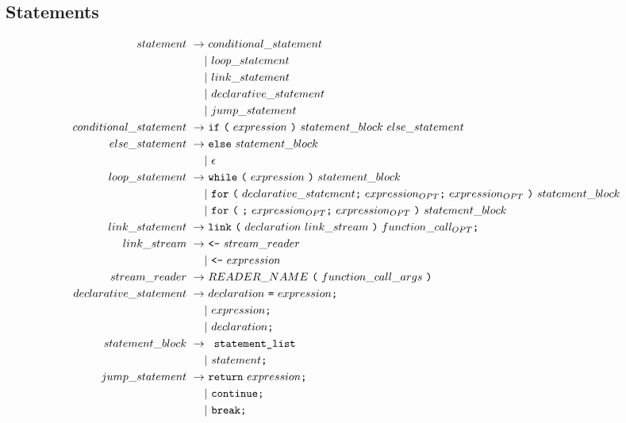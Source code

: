 \documentclass{article}
\newcommand{\code}{\texttt}
\begin{document}
\subsection{Statements}
\begin{align*}
statement\,\,\rightarrow&\,\,conditional\_statement\\
                    & |\,\,loop\_statement\\
                    & |\,\,link\_statement\\
                    & |\,\,declarative\_statement\\
                    & |\,\,jump\_statement\\
conditional\_statement\,\,\rightarrow&\,\,\code{if}\,\,\code{(}\,\,expression\,\,\code{)}\,\, statement\_block\,\,else\_statement\\
else\_statement\,\,\rightarrow&\,\,\code{else}\,\,statement\_block\\
                    & |\,\,\epsilon\\
loop\_statement\,\,\rightarrow&\,\,\code{while}\,\,\code{(}\,\,expression\,\,\code{)}\,\,statement\_block\\
                    & |\,\,\code{for}\,\,\code{(}\,\,declarative\_statement\code{;}\,\,expression_{OPT}\code{;}\,\,expression_{OPT}\,\,\code{)}\,\,statement\_block\\
                    & |\,\,\code{for}\,\,\code{(}\,\,\code{;}\,\,expression_{OPT}\code{;}\,\,expression_{OPT}\,\,\code{)}\,\,statement\_block\\
link\_statement\,\,\rightarrow&\,\,\code{link}\,\,\code{(}\,\,declaration\,\,link\_stream\,\,\code{)}\,\,function\_call_{OPT}\code{;}\\
link\_stream\,\,\rightarrow&\,\,\code{<-}\,\,stream\_reader\\
                    & |\,\,\code{<-}\,\,expression\\
stream\_reader\,\,\rightarrow&\,\,READER\_NAME\,\,\code{(}\,\,function\_call\_args\,\,\code{)}\\
declarative\_statement\,\,\rightarrow&\,\,declaration\,\,\code{=}\,\,expression\code{;}\\
                    & |\,\,expression\code{;}\\
                    & |\,\,declaration\code{;}\\
statement\_block\,\,\rightarrow&\,\,\code{{} statement\_list\,\,\code{}}\\
                    & |\,\,statement\code{;}\\
jump\_statement\,\,\rightarrow&\,\,\code{return}\,\,expression\code{;}\\
                    & |\,\,\code{continue}\code{;}\\
                    & |\,\,\code{break}\code{;}
\end{align*}
\end{document}
